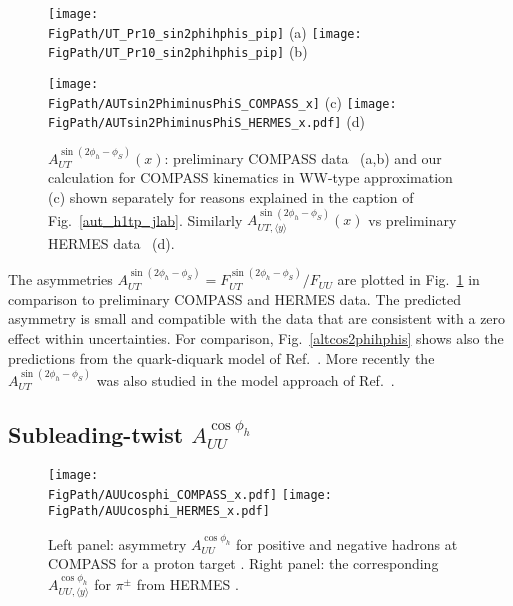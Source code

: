\documentclass[a4paper,11pt]{article}
\newcommand{\gs}[1]{{\color[rgb]{0.65,0,0.65}#1}}
\newcommand*{\FigPath}{./figs}%
\begin{document}
\begin{figure}[t!]
\centering
\texttt{[image: \\FigPath/UT\_Pr10\_sin2phihphis\_pip]} {\tiny (a)}%
\texttt{[image: \\FigPath/UT\_Pr10\_sin2phihphis\_pip]} {\tiny (b)}

\texttt{[image: \\FigPath/AUTsin2PhiminusPhiS\_COMPASS\_x]} {\tiny (c)}
\texttt{[image: \\FigPath/AUTsin2PhiminusPhiS\_HERMES\_x.pdf]} {\tiny (d)}

\vspace{-2mm}

\caption{\label{autsin2phihphis}
	$A_{UT}^{\sin(2 \phi_h - \phi_S)}(x)$: 
	preliminary COMPASS data~\cite{Parsamyan:2013fia} (a,b)
  \gs{and our calculation for COMPASS kinematics in WW-type 
      approximation (c) shown separately for reasons explained 
      in the caption of Fig.~\ref{aut_h1tp_jlab}.}
	Similarly $A_{UT, \langle y \rangle}^{\sin(2\phi_h-\phi_S)}(x)$ vs
	preliminary HERMES data~\cite{Schnell:2010zza} (d).
	}
\end{figure}


The asymmetries $A_{UT}^{\sin (2 \phi_h-\phi_S)}=F_{UT}^{\sin (2 \phi_h-\phi_S)}/F_{UU}$
are plotted in Fig.~\ref{autsin2phihphis} in comparison
to preliminary COMPASS \cite{Parsamyan:2013fia} and
HERMES \cite{Schnell:2010zza} data. The predicted
asymmetry is small and compatible with the data that are consistent
with a zero effect within uncertainties.
For comparison, Fig.~\ref{altcos2phihphis} shows also the predictions
from the quark-diquark model of Ref.~\cite{Kotzinian:2008fe}.
More recently the $A_{UT}^{\sin(2\phi_h -\phi_S)}$ was also studied in the
model approach of Ref.~\cite{Mao:2014aoa}.





\subsection{\boldmath Subleading-twist  $A_{UU}^{\cos\phi_h}$ }
\label{Sec-7.7:FUUcosphi}

\begin{figure}[t!]
\centering
\texttt{[image: \\FigPath/AUUcosphi\_COMPASS\_x.pdf]}
\texttt{[image: \\FigPath/AUUcosphi\_HERMES\_x.pdf]}
\caption{\label{auucosphi_jlab}
	Left panel: asymmetry $A_{UU}^{\cos\phi_h}$ for positive and negative
	hadrons at COMPASS for a proton target \cite{Adolph:2014pwc}. Right
	panel: the corresponding $A_{UU, \langle y \rangle}^{\cos\phi_h}$ for 
	$\pi^\pm$ from HERMES \cite{Airapetian:2012yg}.}
\end{figure}
\end{document}
